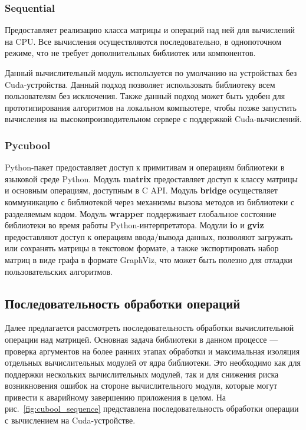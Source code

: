 \subsubsection*{Sequential}

Предоставляет реализацию класса матрицы и операций над ней для вычислений на CPU. Все вычисления осуществляются последовательно, в однопоточном режиме, что не требует дополнительных библиотек или компонентов.

Данный вычислительный модуль используется по умолчанию на устройствах без Cuda-устройства. 
Данный подход позволяет использовать библиотеку всем пользователям без исключения. 
Также данный подход может быть удобен для прототипирования алгоритмов на локальном компьютере, 
чтобы позже запустить вычисления на высокопроизводительном сервере с поддержкой Cuda-вычислений.

\subsubsection*{Pycubool}

Python-пакет предоставляет доступ к примитивам и операциям библиотеки в языковой среде Python.
Модуль \textbf{matrix} предоставляет доступ к классу матрицы и основным операциям, доступным в C API.
Модуль \textbf{bridge} осуществляет коммуникацию с библиотекой через механизмы вызова методов из библиотеки с разделяемым кодом. 
Модуль \textbf{wrapper} поддерживает глобальное состояние библиотеки во время работы Python-интерпретатора. 
Модули \textbf{io} и \textbf{gviz} предоставляют доступ к операциям ввода/вывода данных, 
позволяют загружать или сохранять матрицы в текстовом формате, 
а также экспортировать набор матриц в виде графа в формате GraphViz, 
что может быть полезно для отладки пользовательских алгоритмов.

\subsection{Последовательность обработки операций}

Далее предлагается рассмотреть последовательность обработки вычислительной операции над матрицей. 
Основная задача библиотеки в данном процессе --- проверка аргументов на более ранних этапах обработки и максимальная изоляция отдельных вычислительных модулей от ядра библиотеки. 
Это необходимо как для поддержки нескольких вычислительных модулей, так и для снижения риска возникновения ошибок на стороне вычислительного модуля, которые могут привести к аварийному завершению приложения в целом. 
На рис.~\ref{fig:cubool_sequence} представлена последовательность обработки операции с вычислением на Cuda-устройстве. 

